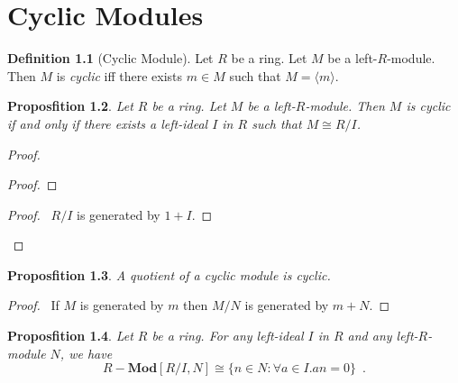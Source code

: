 \documentclass{book}
\let\qed\relax
\newtheorem{prop}{Proposfition}[chapter]
\theoremstyle{definition}
\newtheorem{df}[prop]{Definition}
\newcommand{\Mod}[1]{\ensuremath{{#1}-\mathbf{Mod}}}
\begin{document}
\chapter{Cyclic Modules}

\begin{df}[Cyclic Module]
Let $R$ be a ring. Let $M$ be a left-$R$-module. Then $M$ is \emph{cyclic} iff there exists $m \in M$ such that $M = \langle m \rangle$.
\end{df}

\begin{prop}
Let $R$ be a ring. Let $M$ be a left-$R$-module. Then $M$ is cyclic if and only if there exists a left-ideal $I$ in $R$ such that $M \cong R / I$.
\end{prop}

\begin{proof}
\pf
{}
\begin{proof}
\end{proof}
\begin{proof}
	\pf\ $R/I$ is generated by $1+I$.
\end{proof}
\qed
\end{proof}

\begin{prop}
A quotient of a cyclic module is cyclic.
\end{prop}

\begin{proof}
\pf\ If $M$ is generated by $m$ then $M/N$ is generated by $m+N$. \qed
\end{proof}

\begin{prop}
Let $R$ be a ring.
For any left-ideal $I$ in $R$ and any left-$R$-module $N$, we have
\[ \Mod{R}[R/I,N] \cong \{ n \in N : \forall a \in I. an = 0 \} \enspace . \]
\end{prop}
\end{document}
